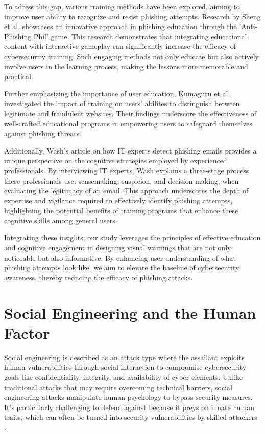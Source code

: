 \documentclass[
  a4paper,  %
  twoside,  %
  bibliography=totoc,
  headsepline,
  cleardoublepage=empty,
  parskip=half,
  draft=false
]{scrbook}
\begin{document}
To adress this gap, various training methods have been explored, aiming to improve user ability to recognize and resist phishing attempts. Research by Sheng et al. \cite{sheng} showcases an innovative approach in phishing education through the 'Anti-Phishing Phil' game. This research demonstrates that integrating educational content with interactive gameplay can significantly increase the efficacy of cybersecurity training. Such engaging methods not only educate but also actively involve users in the learning process, making the lessons more memorable and practical. 

Further emphasizing the importance of user education, Kumaguru et al. \cite{kumaraguru} investigated the impact of training on users' abilites to distinguish between legitimate and fraudulent websites. Their findings underscore the effectiveness of well-crafted educational programs in empowering users to safeguard themselves against phishing threats. 

Additionally, Wash's article \cite{wash} on how IT experts detect phishing emails provides a unique perspective on the cognitive strategies employed by experienced professionals. By interviewing IT experts, Wash explains a three-stage process these professionals use: sensemaking, suspicion, and decision-making, when evaluating the legitimacy of an email. This approach underscores the depth of expertise and vigilance required to effectively identify phishing attempts, highlighting the potential benefits of training programs that enhance these cognitive skills among general users.

Integrating these insights, our study leverages the principles of effective education and cognitive engagement in designing visual warnings that are not only noticeable but also informative. By enhancing user understanding of what phishing attempts look like, we aim to elevate the baseline of cybersecurity awareness, thereby reducing the efficacy of phishing attacks.

\section{Social Engineering and the Human Factor}
Social engineering is described as an attack type where the assailant exploits human vulnerabilities through social interaction to compromise cybersecurity goals like confidentiality, integrity, and availability of cyber elements. Unlike traditional attacks that may require overcoming technical barriers, social engineering attacks manipulate human psychology to bypass security measures. It's particularly challenging to defend against because it preys on innate human traits, which can often be turned into security vulnerabilities by skilled attackers \cite{Wang2021}.
\end{document}
